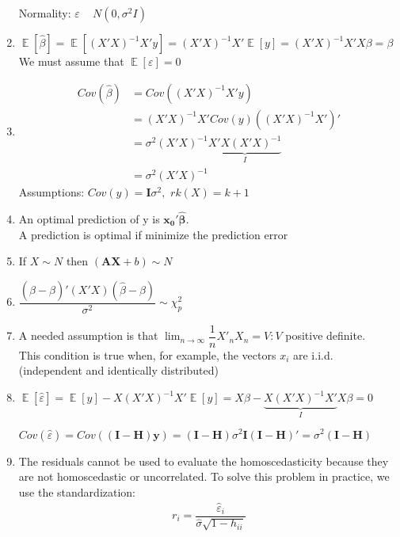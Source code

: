\documentclass[10pt,a4paper]{article}
\DeclareMathOperator{\E}{\mathbb{E}}
\begin{document}
\begin{enumerate}
		Normality: $ \varepsilon  $ ~ $ N(0, \sigma^2 I) $
		\item 
		$ \E \left[ \hat{\beta} \right] = \E \left[ (X'X)^{-1} X'  y \right] = (X'X)^{-1} X' \E \left[y\right] = (X'X)^{-1} X' X \beta = \beta $
		We must assume that $ \E \left[ \varepsilon \right] = 0$
		\item 
		\begin{align*}
		 Cov(\hat{\beta}) &= Cov((X'X)^{-1}X'y)  \\
		  &= (X'X)^{-1}X'Cov(y)((X'X)^{-1}X')' \\
		  &= \sigma^2 (X'X)^{-1}\underbrace{X'X(X'X)^{-1} }_I \\ 
		  &= \sigma^2 (X'X)^{-1}
		\end{align*}
		Assumptions: $ Cov(y) = \mathbf{I} \sigma^2, \,\, rk(X) = k+1$
		\item An optimal prediction of y is $ \mathbf{x_0' \hat{\beta}} $.\\ A prediction is optimal if minimize the prediction error
		\item If $ X \sim N $ then $(\mathbf{AX} + b) \sim N $ 
		\item $ \dfrac{(\hat{\beta} - \beta)' (X'X) (\hat{\beta} - \beta)}{\sigma^2} \sim \chi^2_p $
		\item A needed assumption is that $ \lim_{n \rightarrow \infty} \dfrac{1}{n} X'_n X_n = V : V  $ positive definite. \\
		This condition is true when, for example, the vectors $ x_i $ are i.i.d. (independent and identically distributed)
		\item 
		$ \E \left[ \hat{\varepsilon} \right] = \E \left[ y \right] -  X (X' X )^{-1} X' \E \left[ y \right] =  X \beta -\underbrace{  X (X' X )^{-1} X'}_I  X \beta = 0 $
		
		$ Cov(\hat{\varepsilon}) = Cov((\mathbf{I - H}) \mathbf{y}) = \mathbf{(I - H)} \sigma^2 \mathbf{I (I - H)'} = \sigma^2 \mathbf{(I - H)}$
		\item The residuals cannot be used to evaluate the homoscedasticity because they are not homoscedastic or uncorrelated. To solve this problem in practice, we use the standardization:
		\begin{align*}
			r_i = \dfrac{\hat{\varepsilon}_i}{\hat{\sigma} \sqrt{1 - h_{ii}}}
		\end{align*}
	\end{enumerate}
\end{document}
